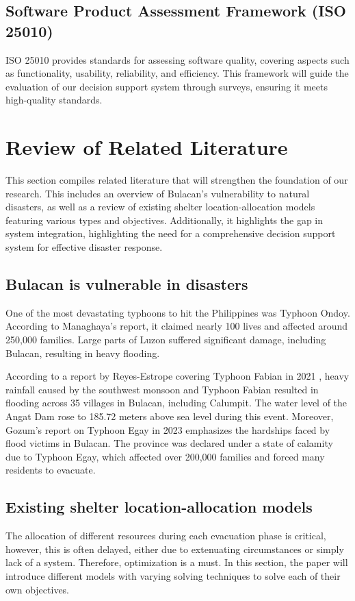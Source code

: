\subsection{Software Product Assessment Framework (ISO 25010)}
	ISO 25010 provides standards for assessing software quality, covering aspects such as functionality, usability, reliability, and efficiency. This framework will guide the evaluation of our decision support system through surveys, ensuring it meets high-quality standards.

\section{Review of Related Literature}
	This section compiles related literature that will strengthen the foundation of our research. This includes an overview of Bulacan's vulnerability to natural disasters, as well as a review of existing shelter location-allocation models featuring various types and objectives. Additionally, it highlights the gap in system integration, highlighting the need for a comprehensive decision support system for effective disaster response.
	
\subsection{Bulacan is vulnerable in disasters}
	One of the most devastating typhoons to hit the Philippines was Typhoon Ondoy. According to Managhaya's report, it claimed nearly 100 lives and affected around 250,000 families. Large parts of Luzon suffered significant damage, including Bulacan, resulting in heavy flooding. \parencite{James2009}

	According to a report by Reyes-Estrope covering Typhoon Fabian in 2021 \parencite{Carmela2021}, heavy rainfall caused by the southwest monsoon and Typhoon Fabian resulted in flooding across 35 villages in Bulacan, including Calumpit. The water level of the Angat Dam rose to 185.72 meters above sea level during this event. Moreover, Gozum's report on Typhoon Egay in 2023 \parencite{Iya2023} emphasizes the hardships faced by flood victims in Bulacan. The province was declared under a state of calamity due to Typhoon Egay, which affected over 200,000 families and forced many residents to evacuate.

\subsection{Existing shelter location-allocation models}
	The allocation of different resources during each evacuation phase is critical, however, this is often delayed, either due to extenuating circumstances or simply lack of a system. Therefore, optimization is a must. In this section, the paper will introduce different models with varying solving techniques to solve each of their own objectives.
	
